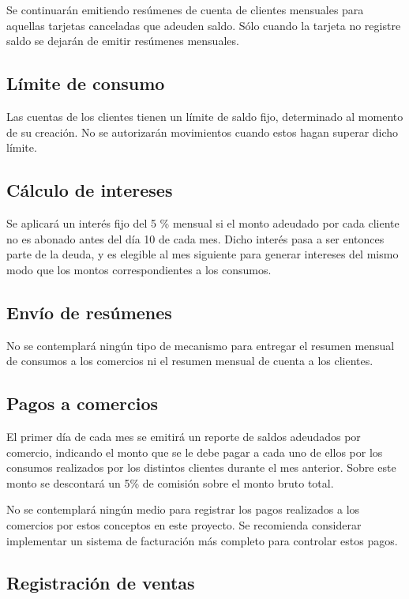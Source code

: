 Se continuarán emitiendo resúmenes de cuenta de clientes mensuales para aquellas
tarjetas canceladas que adeuden saldo. Sólo cuando la tarjeta no registre saldo
se dejarán de emitir resúmenes mensuales.

\subsection{Límite de consumo}

Las cuentas de los clientes tienen un límite de saldo fijo, determinado al momento de su creación. No se autorizarán movimientos cuando estos hagan superar dicho límite.

\subsection{Cálculo de intereses}

Se aplicará un interés fijo del 5 \% mensual si el monto adeudado por cada
cliente no es abonado antes del día 10 de cada mes. Dicho interés pasa a ser
entonces parte de la deuda, y es elegible al mes siguiente para generar
intereses del mismo modo que los montos correspondientes a los consumos.

\subsection{Envío de resúmenes}

No se contemplará ningún tipo de mecanismo para entregar el resumen mensual de
consumos a los comercios ni el resumen mensual de cuenta a los clientes.

\subsection{Pagos a comercios}

El primer día de cada mes se emitirá un reporte de saldos adeudados por
comercio, indicando el monto que se le debe pagar a cada uno de ellos por los
consumos realizados por los distintos clientes durante el mes anterior. Sobre
este monto se descontará un 5\% de comisión sobre el monto bruto total.

No se contemplará ningún medio para registrar los pagos realizados a los
comercios por estos conceptos en este proyecto. Se recomienda considerar
implementar un sistema de facturación más completo para controlar estos pagos.

\subsection{Registración de ventas}

